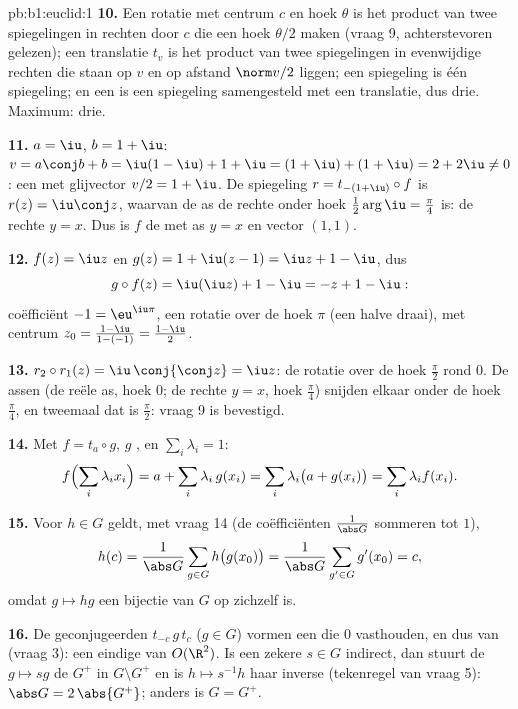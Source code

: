 \begin{solution}{pb:b1:euclid:1}
\textbf{10.} Een rotatie met centrum $c$ en hoek $\theta$ is het
product van twee spiegelingen in rechten door $c$ die een hoek
$\theta/2$ maken (vraag 9, achterstevoren gelezen); een translatie
$t_v$ is het product van twee spiegelingen in evenwijdige rechten
die  staan op $v$ en op afstand $\norm v/2$ liggen; een
spiegeling is één spiegeling; en een  is een
spiegeling samengesteld met een translatie, dus drie. Maximum:
drie.

\textbf{11.} $a = \iu$, $b = 1 + \iu$: $v = a\conj b + b = \iu(1 -
\iu) + 1 + \iu = (1 + \iu) + (1 + \iu) = 2 + 2\iu \neq 0$: een
 met glijvector $v/2 = 1 + \iu$. De spiegeling $r =
t_{-(1+\iu)}\circ f$ is $r(z) = \iu\conj z$, waarvan de as de
rechte onder hoek $\frac12\arg\iu = \frac\pi4$ is: de rechte $y =
x$. Dus is $f$ de  met as $y = x$ en vector $(1,
1)$.

\textbf{12.} $f(z) = \iu z$ en $g(z) = 1 + \iu(z - 1) = \iu z + 1 -
\iu$, dus
\[
g\circ f(z) = \iu(\iu z) + 1 - \iu = -z + 1 - \iu :
\]
 coëfficiënt $-1 = \eu^{\iu\pi}$, een rotatie over de hoek
$\pi$ (een halve draai), met centrum $z_0 = \frac{1 - \iu}{1 -
(-1)} = \frac{1 - \iu}{2}$.

\textbf{13.} $r_2\circ r_1(z) = \iu\,\conj{\conj z} = \iu z$: de
rotatie over de hoek $\frac\pi2$ rond $0$. De assen (de reële as,
hoek $0$; de rechte $y = x$, hoek $\frac\pi4$) snijden elkaar onder
de hoek $\frac\pi4$, en tweemaal dat is $\frac\pi2$: vraag 9 is
bevestigd.

\textbf{14.} Met $f = t_a\circ g$, $g$ , en $\sum_i
\lambda_i = 1$:
\[
f\Bigl(\sum_i \lambda_i x_i\Bigr)
= a + \sum_i \lambda_i\,g(x_i)
= \sum_i \lambda_i\bigl(a + g(x_i)\bigr)
= \sum_i \lambda_i f(x_i) .
\]

\textbf{15.} Voor $h \in G$ geldt, met vraag 14 (de coëfficiënten
$\frac1{\abs G}$ sommeren tot $1$),
\[
h(c) = \frac{1}{\abs G}\sum_{g \in G} h\bigl(g(x_0)\bigr)
= \frac{1}{\abs G}\sum_{g' \in G} g'(x_0) = c ,
\]
omdat $g \mapsto hg$ een bijectie van $G$ op zichzelf is.

\textbf{16.} De geconjugeerden $t_{-c}\,g\,t_{c}$ ($g \in G$)
vormen een   die $0$ vasthouden, en dus van
\emph{}  (vraag 3): een eindige  van
$O(\R^2)$. Is een zekere $s \in G$ indirect, dan stuurt de
 $g \mapsto sg$ de  $G^+$  in $G
\setminus G^+$ en is $h \mapsto s^{-1}h$ haar inverse (tekenregel
van vraag 5): $\abs G = 2\,\abs{G^+}$; anders is $G = G^+$.


\end{solution}
